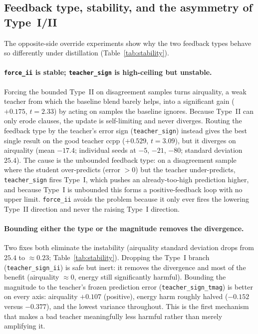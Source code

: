 \subsection{Feedback type, stability, and the asymmetry of Type~I/II}
\label{sec:stability}

The opposite-side override experiments show why the two feedback types behave so
differently under distillation (Table~\ref{tab:stability}).

\paragraph{\texttt{force\_ii} is stable; \texttt{teacher\_sign} is high-ceiling but
unstable.}
Forcing the bounded Type~II on disagreement samples turns airquality, a weak teacher from
which the baseline blend barely helps, into a significant gain ($+0.175$, $t=2.33$) by
acting on samples the baseline ignores. Because Type~II can only erode clauses, the update
is self-limiting and never diverges. Routing the feedback type by the teacher's error sign
(\texttt{teacher\_sign}) instead gives the best single result on the good teacher ccpp
($+0.529$, $t=3.09$), but it diverges on airquality (mean $-17.4$; individual seeds at
$-5$, $-21$, $-80$; standard deviation $25.4$). The cause is the unbounded feedback type:
on a disagreement sample where the student over-predicts (error $>0$) but the teacher
under-predicts, \texttt{teacher\_sign} fires Type~I, which pushes an already-too-high
prediction higher, and because Type~I is unbounded this forms a positive-feedback loop with
no upper limit. \texttt{force\_ii} avoids the problem because it only ever fires the
lowering Type~II direction and never the raising Type~I direction.

\paragraph{Bounding either the type or the magnitude removes the divergence.}
Two fixes both eliminate the instability (airquality standard deviation drops from $25.4$ to
$\approx\!0.23$; Table~\ref{tab:stability}). Dropping the Type~I branch
(\texttt{teacher\_sign\_ii}) is safe but inert: it removes the divergence and most of the
benefit (airquality $\approx\!0$, energy still significantly harmful). Bounding the
magnitude to the teacher's frozen prediction error (\texttt{teacher\_sign\_tmag}) is better
on every axis: airquality $+0.107$ (positive), energy harm roughly halved ($-0.152$ versus
$-0.377$), and the lowest variance throughout. This is the first mechanism that makes a bad
teacher meaningfully less harmful rather than merely amplifying it.

